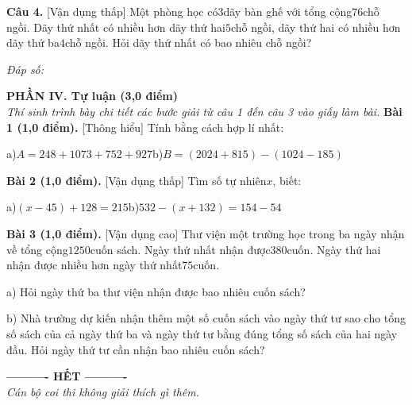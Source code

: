 \documentclass[11pt,a4paper]{article}
\begin{document}
\noindent\textbf{Câu 4.} [Vận dụng thấp] Một phòng học có$3$dãy bàn ghế với tổng cộng$76$chỗ ngồi. Dãy thứ nhất có nhiều hơn dãy thứ hai$5$chỗ ngồi, dãy thứ hai có nhiều hơn dãy thứ ba$4$chỗ ngồi. Hỏi dãy thứ nhất có bao nhiêu chỗ ngồi?\par\vspace{2pt}
\noindent\textit{Đáp số:} \dotfill\par\vspace{6pt}


\vspace{6pt}
\noindent
\textbf{\large PHẦN IV. Tự luận (3,0 điểm)}\\
\textit{\small Thí sinh trình bày chi tiết các bước giải từ câu 1 đến câu 3 vào giấy làm bài.}
\vspace{6pt}
\noindent\textbf{Bài 1 (1,0 điểm).} [Thông hiểu] Tính bằng cách hợp lí nhất:\par\noindent a)$A = 248 + 1073 + 752 + 927$b)$B = (2024 + 815) - (1024 - 185)$\par\vspace{8pt}

\noindent\textbf{Bài 2 (1,0 điểm).} [Vận dụng thấp] Tìm số tự nhiên$x$, biết:\par\noindent a)$(x - 45) + 128 = 215$b)$532 - (x + 132) = 154 - 54$\par\vspace{8pt}

\noindent\textbf{Bài 3 (1,0 điểm).} [Vận dụng cao] Thư viện một trường học trong ba ngày nhận về tổng cộng$1250$cuốn sách. Ngày thứ nhất nhận được$380$cuốn. Ngày thứ hai nhận được nhiều hơn ngày thứ nhất$75$cuốn.\par\noindent a) Hỏi ngày thứ ba thư viện nhận được bao nhiêu cuốn sách?\par\noindent b) Nhà trường dự kiến nhận thêm một số cuốn sách vào ngày thứ tư sao cho tổng số sách của cả ngày thứ ba và ngày thứ tư bằng đúng tổng số sách của hai ngày đầu. Hỏi ngày thứ tư cần nhận bao nhiêu cuốn sách?\par\vspace{8pt}


\begin{center}
\textbf{---------- HẾT ----------}\\
\textit{\small Cán bộ coi thi không giải thích gì thêm.}
\end{center}
\end{document}
